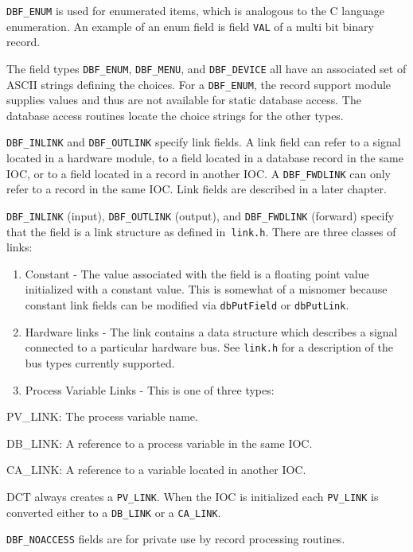 \verb|DBF_ENUM| is used for enumerated items, which is analogous to the C language enumeration. An example of an enum 
field is field \verb|VAL| of a multi bit binary record. 

The field types \verb|DBF_ENUM|, \verb|DBF_MENU|, and \verb|DBF_DEVICE| all have an associated set of ASCII strings defining the 
choices. For a \verb|DBF_ENUM|, the record support module supplies values and thus are not available for static database access. 
The database access routines locate the choice strings for the other types.

\verb|DBF_INLINK| and \verb|DBF_OUTLINK| specify link fields. A link field can refer to a signal located in a hardware module, to a 
field located in a database record in the same IOC, or to a field located in a record in another IOC. A \verb|DBF_FWDLINK| can 
only refer to a record in the same IOC. Link fields are described in a later chapter. 

\verb|DBF_INLINK| (input), \verb|DBF_OUTLINK| (output), and \verb|DBF_FWDLINK| (forward) specify that the field is a link structure as 
defined in\verb| link.h|. There are three classes of links:

\begin{enumerate}\item Constant - The value associated with the field is a floating point value initialized with a constant value. This is 
somewhat of a misnomer because constant link fields can be modified via \verb|dbPutField| or \verb|dbPutLink|.

\item Hardware links - The link contains a data structure which describes a signal connected to a particular hardware bus. 
See \verb|link.h| for a description of the bus types currently supported.

\item Process Variable Links - This is one of three types:

\end{enumerate}PV\_LINK: The process variable name.

DB\_LINK: A reference to a process variable in the same IOC.

CA\_LINK: A reference to a variable located in another IOC.

DCT always creates a \verb|PV_LINK|. When the IOC is initialized each \verb|PV_LINK| is converted either to a \verb|DB_LINK| or a 
\verb|CA_LINK|.

\verb|DBF_NOACCESS| fields are for private use by record processing routines.

